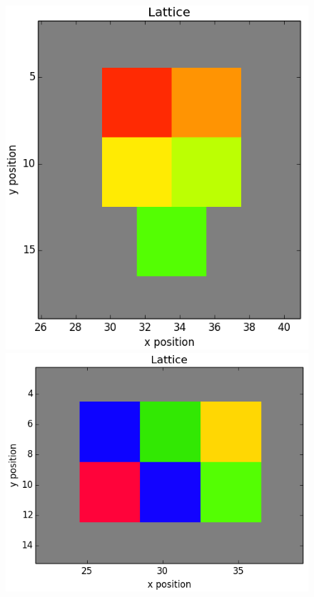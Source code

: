 \documentclass[12pt]{article}
\begin{document}
\begin{figure}[h]
	\includegraphics[scale=0.20]{img/5ctc_start}
	\includegraphics[scale=0.20]{img/6ctc_start}

\end{figure}
\end{document}
